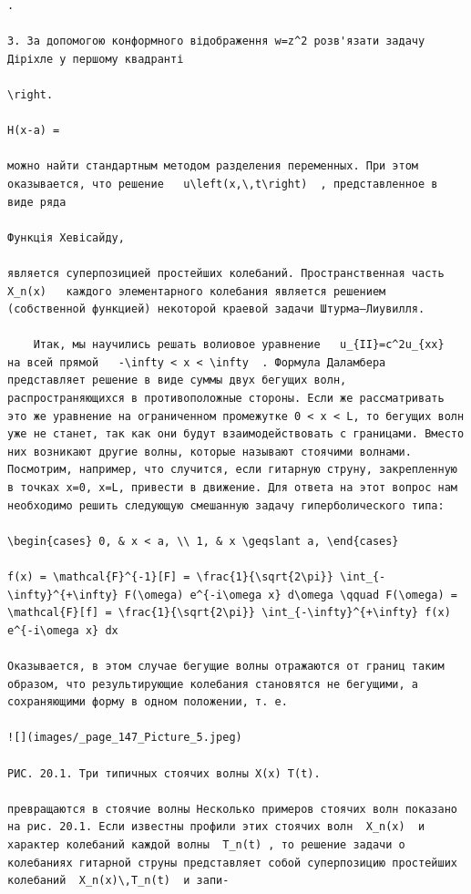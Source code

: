 \documentclass[
  ukrainian,
]{article}
\begin{document}
\begin{verbatim}
.

3. За допомогою конформного відображення w=z^2 розв'язати задачу Діріхле у першому квадранті

\right.

H(x-a) =

можно найти стандартным методом разделения переменных. При этом оказывается, что решение   u\left(x,\,t\right)  , представленное в виде ряда

Функція Хевісайду,

является суперпозицией простейших колебаний. Пространственная часть   X_n(x)   каждого элементарного колебания является решением (собственной функцией) некоторой краевой задачи Штурма—Лиувилля.

    Итак, мы научились решать волиовое уравнение   u_{II}=c^2u_{xx}   на всей прямой   -\infty < x < \infty  . Формула Даламбера представляет решение в виде суммы двух бегущих волн, распространяющихся в противоположные стороны. Если же рассматривать это же уравнение на ограниченном промежутке 0 < x < L, то бегущих волн уже не станет, так как они будут взаимодействовать с границами. Вместо них возникают другие волны, которые называют стоячими волнами. Посмотрим, например, что случится, если гитарную струну, закрепленную в точках x=0, x=L, привести в движение. Для ответа на этот вопрос нам необходимо решить следующую смешанную задачу гиперболического типа:

\begin{cases} 0, & x < a, \\ 1, & x \geqslant a, \end{cases}

f(x) = \mathcal{F}^{-1}[F] = \frac{1}{\sqrt{2\pi}} \int_{-\infty}^{+\infty} F(\omega) e^{-i\omega x} d\omega \qquad F(\omega) = \mathcal{F}[f] = \frac{1}{\sqrt{2\pi}} \int_{-\infty}^{+\infty} f(x) e^{-i\omega x} dx

Оказывается, в этом случае бегущие волны отражаются от границ таким образом, что результирующие колебания становятся не бегущими, а сохраняющими форму в одном положении, т. е.

![](images/_page_147_Picture_5.jpeg)

РИС. 20.1. Три типичных стоячих волны X(x) T(t).

превращаются в стоячие волны Несколько примеров стоячих волн показано на рис. 20.1. Если известны профили этих стоячих волн  X_n(x)  и характер колебаний каждой волны  T_n(t) , то решение задачи о колебаниях гитарной струны представляет собой суперпозицию простейших колебаний  X_n(x)\,T_n(t)  и запи-


\end{verbatim}
\end{document}
